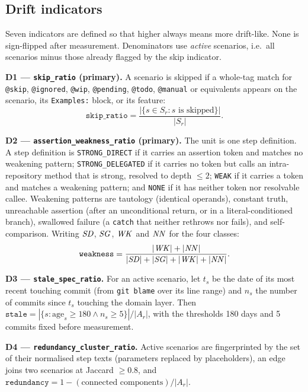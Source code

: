\subsection{Drift indicators}

Seven indicators are defined so that higher always means more drift-like. None is sign-flipped after
measurement. Denominators use \emph{active} scenarios, i.e.\ all scenarios minus those already
flagged by the skip indicator.

\textbf{D1 --- \texttt{skip\_ratio} (primary).} A scenario is skipped if a whole-tag match for
\texttt{@skip}, \texttt{@ignored}, \texttt{@wip}, \texttt{@pending}, \texttt{@todo},
\texttt{@manual} or equivalents appears on the scenario, its \texttt{Examples:} block, or its feature:
\begin{equation}
\texttt{skip\_ratio} = \frac{|\{s \in S_r : s \text{ is skipped}\}|}{|S_r|}.
\end{equation}

\textbf{D2 --- \texttt{assertion\_weakness\_ratio} (primary).} The unit is one step definition. A step
definition is \texttt{STRONG\_DIRECT} if it carries an assertion token and matches no weakening
pattern; \texttt{STRONG\_DELEGATED} if it carries no token but calls an intra-repository method that
is strong, resolved to depth $\le 2$; \texttt{WEAK} if it carries a token and matches a weakening
pattern; and \texttt{NONE} if it has neither token nor resolvable callee. Weakening patterns are
tautology (identical operands), constant truth, unreachable assertion (after an unconditional return,
or in a literal-conditioned branch), swallowed failure (a \texttt{catch} that neither rethrows nor
fails), and self-comparison. Writing $\mathit{SD}$, $\mathit{SG}$, $\mathit{WK}$ and $\mathit{NN}$ for the four classes:
\begin{equation}
\texttt{weakness} =
\frac{|\mathit{WK}| + |\mathit{NN}|}{|\mathit{SD}| + |\mathit{SG}| + |\mathit{WK}| + |\mathit{NN}|}.
\end{equation}

\textbf{D3 --- \texttt{stale\_spec\_ratio}.} For an active scenario, let $t_s$ be the date of its
most recent touching commit (from \texttt{git blame} over its line range) and $n_s$ the number of
commits since $t_s$ touching the domain layer. Then
$\texttt{stale} = |\{s : \mathrm{age}_s \ge 180 \wedge n_s \ge 5\}| / |A_r|$, with the thresholds 180
days and 5 commits fixed before measurement.

\textbf{D4 --- \texttt{redundancy\_cluster\_ratio}.} Active scenarios are fingerprinted by the set of
their normalised step texts (parameters replaced by placeholders), an edge joins two scenarios at
Jaccard $\ge 0.8$, and $\texttt{redundancy} = 1 - (\text{connected components})/|A_r|$.

